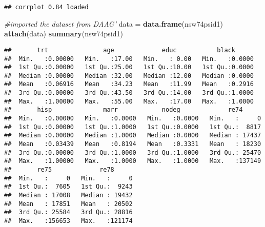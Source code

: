 \documentclass[]{article}
\newenvironment{Shaded}{\begin{snugshade}}{\end{snugshade}}
\newcommand{\KeywordTok}[1]{\textcolor[rgb]{0.13,0.29,0.53}{\textbf{#1}}}
\newcommand{\StringTok}[1]{\textcolor[rgb]{0.31,0.60,0.02}{#1}}
\newcommand{\CommentTok}[1]{\textcolor[rgb]{0.56,0.35,0.01}{\textit{#1}}}
\newcommand{\NormalTok}[1]{#1}
\begin{document}
\begin{verbatim}
## corrplot 0.84 loaded
\end{verbatim}

\begin{Shaded}
\begin{Highlighting}[]
\CommentTok{#imported the dataset from DAAG'}
\NormalTok{data =}\StringTok{ }\KeywordTok{data.frame}\NormalTok{(nsw74psid1)}
\KeywordTok{attach}\NormalTok{(data)}
\KeywordTok{summary}\NormalTok{(nsw74psid1)}
\end{Highlighting}
\end{Shaded}

\begin{verbatim}
##       trt               age             educ           black       
##  Min.   :0.00000   Min.   :17.00   Min.   : 0.00   Min.   :0.0000  
##  1st Qu.:0.00000   1st Qu.:25.00   1st Qu.:10.00   1st Qu.:0.0000  
##  Median :0.00000   Median :32.00   Median :12.00   Median :0.0000  
##  Mean   :0.06916   Mean   :34.23   Mean   :11.99   Mean   :0.2916  
##  3rd Qu.:0.00000   3rd Qu.:43.50   3rd Qu.:14.00   3rd Qu.:1.0000  
##  Max.   :1.00000   Max.   :55.00   Max.   :17.00   Max.   :1.0000  
##       hisp              marr            nodeg             re74       
##  Min.   :0.00000   Min.   :0.0000   Min.   :0.0000   Min.   :     0  
##  1st Qu.:0.00000   1st Qu.:1.0000   1st Qu.:0.0000   1st Qu.:  8817  
##  Median :0.00000   Median :1.0000   Median :0.0000   Median : 17437  
##  Mean   :0.03439   Mean   :0.8194   Mean   :0.3331   Mean   : 18230  
##  3rd Qu.:0.00000   3rd Qu.:1.0000   3rd Qu.:1.0000   3rd Qu.: 25470  
##  Max.   :1.00000   Max.   :1.0000   Max.   :1.0000   Max.   :137149  
##       re75             re78       
##  Min.   :     0   Min.   :     0  
##  1st Qu.:  7605   1st Qu.:  9243  
##  Median : 17008   Median : 19432  
##  Mean   : 17851   Mean   : 20502  
##  3rd Qu.: 25584   3rd Qu.: 28816  
##  Max.   :156653   Max.   :121174
\end{verbatim}
\end{document}
